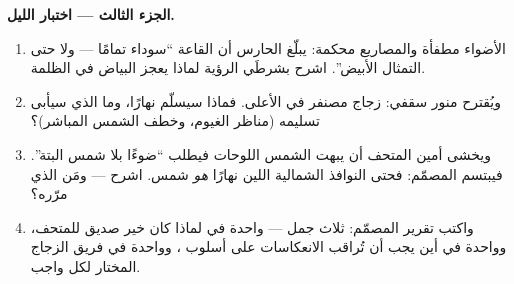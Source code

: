\begin{problem}
\medskip\noindent\textbf{الجزء الثالث --- اختبار الليل.}
\begin{enumerate}[resume]
  \item الأضواء مطفأة والمصاريع محكمة: يبلّغ الحارس أن القاعة
        ``سوداء تمامًا --- ولا حتى التمثال الأبيض''. اشرح
        بشرطَي الرؤية لماذا يعجز البياض في الظلمة.
  \item ويُقترح منور سقفي: زجاج مصنفر في الأعلى. فماذا سيسلّم
        نهارًا، وما الذي سيأبى تسليمه (مناظر الغيوم، وخطف
        الشمس المباشر)؟
  \item ويخشى أمين المتحف أن يبهت  الشمس اللوحات فيطلب
        ``ضوءًا بلا شمس البتة''. فيبتسم المصمّم: فحتى 
        النوافذ الشمالية اللين نهارًا \emph{هو}  شمس. اشرح
        --- ومَن الذي مرّره؟
  \item واكتب تقرير المصمّم: ثلاث جمل --- واحدة في لماذا كان
         خير صديق للمتحف، وواحدة في أين يجب أن تُراقب
        الانعكاسات على أسلوب ، وواحدة في فريق الزجاج
        المختار لكل واجب.
\end{enumerate}
\end{problem}
